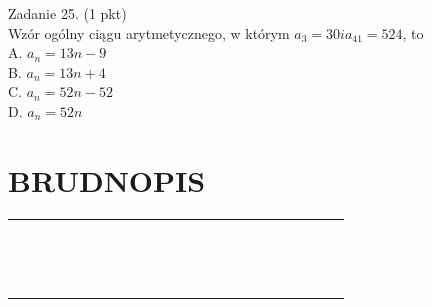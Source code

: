 \documentclass[10pt]{article}
\begin{document}
Zadanie 25. (1 pkt)\\
Wzór ogólny ciągu arytmetycznego, w którym \(a_{3}=30 i a_{41}=524\), to\\
A. \(a_{n}=13 n-9\)\\
B. \(a_{n}=13 n+4\)\\
C. \(a_{n}=52 n-52\)\\
D. \(a_{n}=52 n\)

\section*{BRUDNOPIS}
\begin{center}
\begin{tabular}{|c|c|c|c|c|c|c|c|c|c|c|c|c|c|c|c|c|c|c|c|c|c|c|c|}
\hline
 &  &  &  &  &  &  &  &  &  &  &  &  &  &  &  &  &  &  &  &  &  &  &  \\
\hline
 &  &  &  &  &  &  &  &  &  &  &  &  &  &  &  &  &  &  &  &  &  &  &  \\
\hline
 &  &  &  &  &  &  &  &  &  &  &  &  &  &  &  &  &  &  &  &  &  &  &  \\
\hline
 &  &  &  &  &  &  &  &  &  &  &  &  &  &  &  &  &  &  &  &  &  &  &  \\
\hline
 &  &  &  &  &  &  &  &  &  &  &  &  &  &  &  &  &  &  &  &  &  &  &  \\
\hline
 &  &  &  &  &  &  &  &  &  &  &  &  &  &  &  &  &  &  &  &  &  &  &  \\
\hline
 &  &  &  &  &  &  &  &  &  &  &  &  &  &  &  &  &  &  &  &  &  &  &  \\
\hline
 &  &  &  &  &  &  &  &  &  &  &  &  &  &  &  &  &  &  &  &  &  &  &  \\
\hline
 &  &  &  &  &  &  &  &  &  &  &  &  &  &  &  &  &  &  &  &  &  &  &  \\
\hline
 &  &  &  &  &  &  &  &  &  &  &  &  &  &  &  &  &  &  &  &  &  &  &  \\
\hline
 &  &  &  &  &  &  &  &  &  &  &  &  &  &  &  &  &  &  &  &  &  &  &  \\
\hline
 &  &  &  &  &  &  &  &  &  &  &  &  &  &  &  &  &  &  &  &  &  &  &  \\
\hline
 &  &  &  &  &  &  &  &  &  &  &  &  &  &  &  &  &  &  &  &  &  &  &  \\
\hline
 &  &  &  &  &  &  &  &  &  &  &  &  &  &  &  &  &  &  &  &  &  &  &  \\
\hline
 &  &  &  &  &  &  &  &  &  &  &  &  &  &  &  &  &  &  &  &  &  &  &  \\
\hline
 &  &  &  &  &  &  &  &  &  &  &  &  &  &  &  &  &  &  &  &  &  &  &  \\

\end{tabular}
\end{center}
\end{document}
